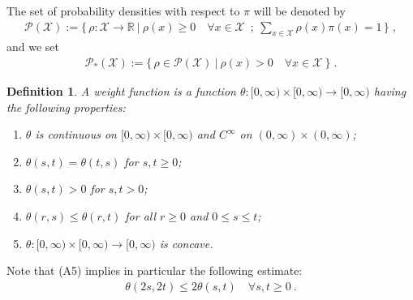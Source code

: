 \documentclass[a4paper,11pt,reqno]{amsart}
\theoremstyle{plain}
\newtheorem{definition}[theorem]{Definition}
\theoremstyle{remark}
\numberwithin{equation}{section}
\begin{document}
The set of probability densities with respect to $\pi$ will be
denoted by
\begin{align*}
 {{\mathscr{P}}({\mathcal{X}})} := \Big\{ \, \rho : {\mathcal{X}} \to {{\mathbb R}} \ | \ 
    \rho(x) \geq 0 \quad \forall x \in {\mathcal{X}}\   \;; \ \sum_{x \in {\mathcal{X}}} \rho(x)\pi(x)   = 1 \, \Big\}\;,
\end{align*}
and we set
\begin{align*}
 {{\mathscr{P}}_*({\mathcal{X}})} := \Big\{ \, \rho \in {{\mathscr{P}}({\mathcal{X}})} \ | \ 
    \rho(x) > 0 \quad \forall x \in {\mathcal{X}}\ \Big\}\;.
\end{align*}
\begin{definition}\label{def:weight}
  A \emph{weight function} is a function $\theta : [0,\infty) \times
  [0,\infty) \to [0,\infty)$ having the following properties:
  \begin{enumerate}
  \item[(A1)] $\theta$ is continuous on $[0,\infty) \times
  [0,\infty)$ and
    $C^\infty$ on $(0,\infty) \times (0,\infty)$;
  \item[(A2)] $\theta(s,t) = \theta(t,s)$ for $s, t \geq 0$;
  \item[(A3)] $\theta(s,t) > 0$ for $s,t > 0$;
  \item[(A4)] $\theta(r,s) \leq \theta(r,t)$ for all $r \geq 0$ and $0 \leq s \leq t$;
  \item[(A5)] $\theta : [0,\infty) \times [0,\infty) \to [0,\infty)$ is concave.
  \end{enumerate}
\end{definition}
Note that (A5) implies in particular the following estimate:
\begin{align*}
\theta(2 s, 2 t) \leq 2 \theta(s,t)\quad\forall s,t\geq0\ .
\end{align*}
\end{document}

